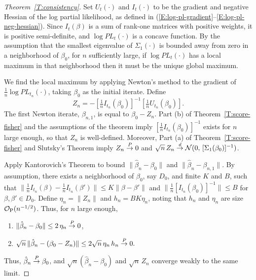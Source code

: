 \documentclass[final]{statsoc}
\begin{document}
\begin{proof}[Theorem~\ref{T:consistency}]
Set $U_t(\cdot)$ and $I_t(\cdot)$ to be the gradient and negative
Hessian of the log partial likelihood, as defined in
(\ref{E:log-pl-gradient}--\ref{E:log-pl-neg-hessian}).  Since
$I_t(\beta)$ is a sum of rank-one matrices with positive weights,
it is positive semi-definite, and $\log \mathit{PL}_t(\cdot)$ is
a concave function.  By the assumption that the smallest
eigenvalue of $\Sigma_1(\cdot)$ is bounded away from zero in a neighborhood
of $\beta_0$, for $n$ sufficiently large, if $\log \mathit{PL}_t(\cdot)$ has a
local maximum in that neighborhood then it must be the unique global maximum.

We find the local maximum by applying Newton's method to the
gradient of $\tfrac{1}{n} \log \mathit{PL}_{t_n}(\cdot)$, taking
$\beta_0$ as the initial iterate.  Define
\[
   Z_n = -[\tfrac{1}{n} I_{t_n}(\beta_0)]^{-1} [ \tfrac{1}{n} U_{t_n}(\beta_0)].
\]
The first Newton iterate, $\beta_{n,1}$, is equal to $\beta_0 - Z_n$.
Part (b) of Theorem~\ref{T:score-fisher} and the
assumptions of the theorem imply $[\tfrac{1}{n} I_{t_n}(\beta_0)]^{-1}$
exists for $n$ large enough, so that $Z_n$ is well-defined.
Moreover, Part (a) of Theorem~\ref{T:score-fisher} and Slutsky's Theorem imply
$Z_n \overset{\mathit{P}}{\to} 0$ and
$\sqrt{n} \, Z_n \overset{\mathit{d}}{\to} \mathcal{N}(0,\, [\Sigma_1(\beta_0)]^{-1})$.


Apply Kantorovich's Theorem to bound $\| \hat \beta_n - \beta_0 \|$
and $\| \hat \beta_n - \beta_{n,1} \|$.  By assumption, there exists
a neighborhood of $\beta_0$, say $D_0$, and finite $K$ and $B$, such that
\(
    \|
        \frac{1}{n} I_{t_n} (\beta)
        -
        \frac{1}{n} I_{t_n}(\beta')
    \|
    \leq
    K
    \|
        \beta
        -
        \beta'
    \|
\)
and
\(
    \| \frac{1}{n} [I_{t_n}(\beta_0)]^{-1} \| \leq B
\)
for $\beta, \beta' \in D_0$.
Define $\eta_n = \| Z_n \|$ and $h_n = B K \eta_n$, noting that $h_n$ and
$\eta_n$ are size $\mathcal{O}_\text{P}(n^{-1/2})$.  Thus, for $n$ large enough,
\begin{enumerate}
    \item $\| \hat \beta_n - \beta_0 \| \leq 2 \, \eta_n \overset{\mathit{P}}{\to} 0$,
    \item
        \(
            \sqrt{n} \, \| \hat \beta_n - (\beta_0 - Z_n) \|
            \leq
            2 \sqrt{n} \, \eta_n \, h_n
            \overset{\mathit{P}}{\to} 0.
        \)
\end{enumerate}
Thus, $\hat \beta_n \overset{\mathit{P}}{\to} \beta_0$, and $\sqrt{n} (\hat \beta_n - \beta_0)$
and $\sqrt{n} \, Z_n$ converge weakly to the same limit.
\end{proof}
\end{document}
